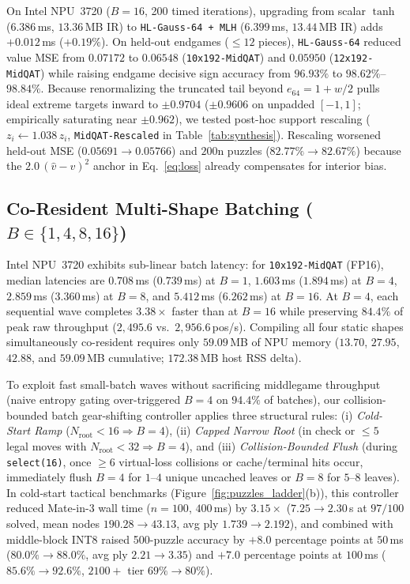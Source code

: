 \documentclass[10pt,twocolumn]{article}
\begin{document}
On Intel NPU~3720 ($B=16$, 200 timed iterations), upgrading from scalar $\tanh$ ($6.386$\,ms, $13.36$\,MB IR) to \texttt{HL-Gauss-64 + MLH} ($6.399$\,ms, $13.44$\,MB IR) adds $+0.012$\,ms ($+0.19\%$). On held-out endgames ($\le 12$ pieces), \texttt{HL-Gauss-64} reduced value MSE from $0.07172$ to $0.06548$ (\texttt{10x192-MidQAT}) and $0.05950$ (\texttt{12x192-MidQAT}) while raising endgame decisive sign accuracy from $96.93\%$ to $98.62\%$--$98.84\%$. Because renormalizing the truncated tail beyond $e_{64} = 1 + w/2$ pulls ideal extreme targets inward to $\pm 0.9704$ ($\pm 0.9606$ on unpadded $[-1,1]$; empirically saturating near $\pm 0.962$), we tested post-hoc support rescaling ($z_i \leftarrow 1.038\,z_i$, \texttt{MidQAT-Rescaled} in Table~\ref{tab:synthesis}). Rescaling worsened held-out MSE ($0.05691 \to 0.05766$) and $200\text{n}$ puzzles ($82.77\% \to 82.67\%$) because the $2.0\,(\hat{v} - v)^2$ anchor in Eq.~\eqref{eq:loss} already compensates for interior bias.

\subsection{Co-Resident Multi-Shape Batching ($B\in\{1,4,8,16\}$)}
Intel NPU~3720 exhibits sub-linear batch latency: for \texttt{10x192-MidQAT} (FP16), median latencies are $0.708$\,ms ($0.739$\,ms) at $B=1$, $1.603$\,ms ($1.894$\,ms) at $B=4$, $2.859$\,ms ($3.360$\,ms) at $B=8$, and $5.412$\,ms ($6.262$\,ms) at $B=16$. At $B=4$, each sequential wave completes $3.38\times$ faster than at $B=16$ while preserving $84.4\%$ of peak raw throughput ($2{,}495.6$ vs.\ $2{,}956.6$\,pos/s). Compiling all four static shapes simultaneously co-resident requires only $59.09$\,MB of NPU memory ($13.70$, $27.95$, $42.88$, and $59.09$\,MB cumulative; $172.38$\,MB host RSS delta).

To exploit fast small-batch waves without sacrificing middlegame throughput (naive entropy gating over-triggered $B=4$ on $94.4\%$ of batches), our collision-bounded batch gear-shifting controller applies three structural rules: (i) \emph{Cold-Start Ramp} ($N_{\mathrm{root}} < 16 \Rightarrow B=4$), (ii) \emph{Capped Narrow Root} (in check or $\le 5$ legal moves with $N_{\mathrm{root}} < 32 \Rightarrow B=4$), and (iii) \emph{Collision-Bounded Flush} (during \texttt{select(16)}, once $\ge 6$ virtual-loss collisions or cache/terminal hits occur, immediately flush $B=4$ for $1\text{--}4$ unique uncached leaves or $B=8$ for $5\text{--}8$ leaves). In cold-start tactical benchmarks (Figure~\ref{fig:puzzles_ladder}(b)), this controller reduced Mate-in-3 wall time ($n=100$, $400$\,ms) by $3.15\times$ ($7.25 \to 2.30$\,s at $97/100$ solved, mean nodes $190.28 \to 43.13$, avg ply $1.739 \to 2.192$), and combined with middle-block INT8 raised 500-puzzle accuracy by $+8.0$ percentage points at $50$\,ms ($80.0\% \to 88.0\%$, avg ply $2.21 \to 3.35$) and $+7.0$ percentage points at $100$\,ms ($85.6\% \to 92.6\%$, $2100+$ tier $69\% \to 80\%$).
\end{document}
